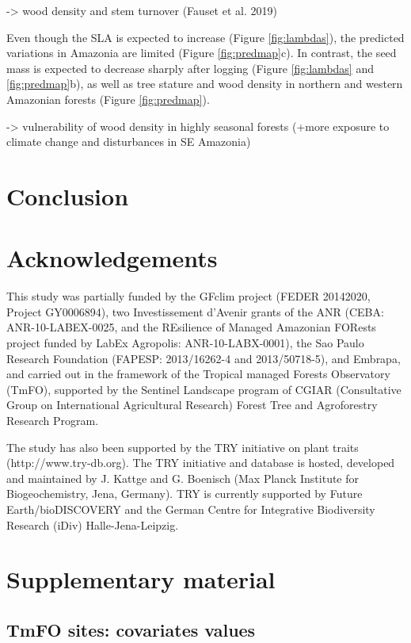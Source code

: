 \documentclass[]{elsarticle} %
\begin{document}
-\textgreater{} wood density and stem turnover (Fauset et al. 2019)

Even though the SLA is expected to increase (Figure \ref{fig:lambdas}),
the predicted variations in Amazonia are limited (Figure
\ref{fig:predmap}c). In contrast, the seed mass is expected to decrease
sharply after logging (Figure \ref{fig:lambdas} and \ref{fig:predmap}b),
as well as tree stature and wood density in northern and western
Amazonian forests (Figure \ref{fig:predmap}).

-\textgreater{} vulnerability of wood density in highly seasonal forests
(+more exposure to climate change and disturbances in SE Amazonia)

\section{Conclusion}\label{conclusion}

\section{Acknowledgements}\label{acknowledgements}

This study was partially funded by the GFclim project (FEDER 20142020,
Project GY0006894), two Investissement d'Avenir grants of the ANR (CEBA:
ANR-10-LABEX-0025, and the REsilience of Managed Amazonian FORests
project funded by LabEx Agropolis: ANR-10-LABX-0001), the Sao Paulo
Research Foundation (FAPESP: 2013/16262-4 and 2013/50718-5), and
Embrapa, and carried out in the framework of the Tropical managed
Forests Observatory (TmFO), supported by the Sentinel Landscape program
of CGIAR (Consultative Group on International Agricultural Research)
Forest Tree and Agroforestry Research Program.

The study has also been supported by the TRY initiative on plant traits
(http://www.try-db.org). The TRY initiative and database is hosted,
developed and maintained by J. Kattge and G. Boenisch (Max Planck
Institute for Biogeochemistry, Jena, Germany). TRY is currently
supported by Future Earth/bioDISCOVERY and the German Centre for
Integrative Biodiversity Research (iDiv) Halle-Jena-Leipzig.

\section{Supplementary material}\label{supplementary-material}

\subsection{TmFO sites: covariates
values}\label{tmfo-sites-covariates-values}
\end{document}

